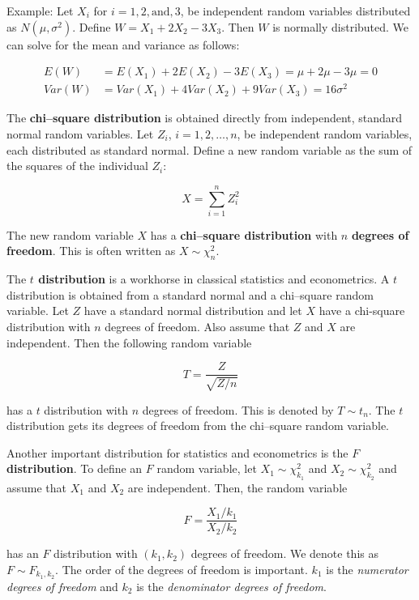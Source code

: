 \documentclass[11pt]{article}
\begin{document}
Example: Let $X_{i}$ for $i = 1, 2, \mbox{and}, 3$, be independent random variables distributed as $N(\mu, \sigma^{2})$.
Define $W = X_{1} + 2X_{2} - 3X_{3}$. Then $W$ is normally distributed. We can solve for the mean and variance as
follows: 

\begin{align*}
E(W) &= E(X_{1}) + 2E(X_{2}) - 3E(X_{3}) = \mu + 2\mu - 3\mu = 0 \\
Var(W) &= Var(X_{1}) + 4Var(X_{2}) + 9Var(X_{3}) = 16\sigma^{2}
\end{align*}

\vspace{2mm}

The \textbf{chi--square distribution} is obtained directly from independent, standard normal random variables.
Let $Z_{i}$, $i = 1, 2, \ldots, n$, be independent random variables, each distributed as standard normal. Define a
new random variable as the sum of the squares of the individual $Z_{i}$:

\begin{equation*}
X = \sum\limits_{i=1}^{n} Z_{i}^{2}
\end{equation*}

The new random variable $X$ has a \textbf{chi--square distribution} with $n$ \textbf{degrees of freedom}. This is 
often written as $X \sim \chi_{n}^{2}$.

\vspace{2mm}

The \textbf{$t$ distribution} is a workhorse in classical statistics and econometrics. A $t$ distribution is
obtained from a standard normal and a chi--square random variable. Let $Z$ have a standard normal distribution
and let $X$ have a chi-square distribution with $n$ degrees of freedom. Also assume that $Z$ and $X$ are independent.
Then the following random variable

\begin{equation*}
T = \frac{Z}{\sqrt{Z/n}}
\end{equation*} 

has a $t$ distribution with $n$ degrees of freedom. This is denoted by $T \sim t_{n}$. The $t$ distribution gets
its degrees of freedom from the chi--square random variable.

\vspace{2mm}

Another important distribution for statistics and econometrics is the \textbf{$F$ distribution}. To define an $F$
random variable, let $X_{1} \sim \chi_{k_{1}}^{2}$ and $X_{2} \sim \chi_{k_{2}}^{2}$ and assume that $X_{1}$ and
$X_{2}$ are independent. Then, the random variable

\begin{equation*}
F = \frac{X_{1}/k_{1}}{X_{2}/k_{2}}
\end{equation*}

has an $F$ distribution with $(k_{1}, k_{2})$ degrees of freedom. We denote this as $F \sim F_{k_{1}, k_{2}}$. The 
order of the degrees of freedom is important. $k_{1}$ is the \emph{numerator degrees of freedom} and $k_{2}$ is 
the \emph{denominator degrees of freedom}.
\end{document}

